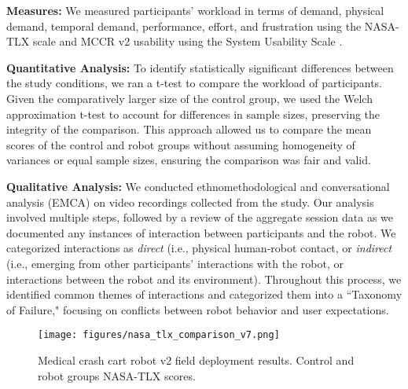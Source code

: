 \textbf{Measures:} We measured participants' workload in terms of demand, physical demand, temporal demand, performance, effort, and frustration using the NASA-TLX scale \cite{hart2006nasa} and MCCR v2 usability using the System Usability Scale \cite{brooke1996sus}.


\textbf{Quantitative Analysis:} To identify statistically significant differences between the study conditions, we ran a t-test to compare the workload of participants. Given the comparatively larger size of the control group, we used the Welch approximation t-test to account for differences in sample sizes, preserving the integrity of the comparison. This approach allowed us to compare the mean scores of the control and robot groups without assuming homogeneity of variances or equal sample sizes, ensuring the comparison was fair and valid.

\textbf{Qualitative Analysis:} We conducted ethnomethodological and conversational analysis (EMCA) \cite{haddington2023emca} on video recordings collected from the study. Our analysis involved multiple steps, followed by a review of the aggregate session data as we documented any instances of interaction between participants and the robot. We categorized interactions as \textit{direct} (i.e., physical human-robot contact, or \textit{indirect} (i.e., emerging from other participants' interactions with the robot, or interactions between the robot and its environment). Throughout this process, we identified common themes of interactions and categorized them into a ``Taxonomy of Failure," focusing on conflicts between robot behavior and user expectations. %


\begin{figure}[t] 
	\centering 
	\texttt{[image: figures/nasa\_tlx\_comparison\_v7.png]} 
	\caption{Medical crash cart robot v2 field deployment results. Control and robot groups NASA-TLX \cite{hart2006nasa} scores.}%
	\label{fig:robot-sus-nasa} 
    \vspace{-5pt}
\end{figure}

